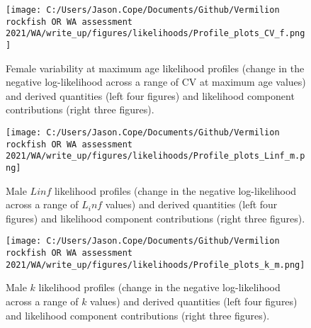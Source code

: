 \documentclass[11pt,
  english,
  a4paper,
]{article}
\begin{document}
\tagmcend\tagstructend


\begin{figure}
\centering
\texttt{[image: C:/Users/Jason.Cope/Documents/Github/Vermilion rockfish OR WA assessment 2021/WA/write\_up/figures/likelihoods/Profile\_plots\_CV\_f.png]}
\caption{Female variability at maximum age likelihood profiles (change in the negative log-likelihood across a range of CV at maximum age values) and derived quantities (left four figures) and likelihood component contributions (right three figures).\label{fig:CVold_f-profile-combo}}
\end{figure}

\tagmcend\tagstructend


\begin{figure}
\centering
\texttt{[image: C:/Users/Jason.Cope/Documents/Github/Vermilion rockfish OR WA assessment 2021/WA/write\_up/figures/likelihoods/Profile\_plots\_Linf\_m.png]}
\caption{Male {\(Linf\)\leavevmode\tagmcend\tagstructend} likelihood profiles (change in the negative log-likelihood across a range of {\(L_inf\)\leavevmode\tagmcend\tagstructend} values) and derived quantities (left four figures) and likelihood component contributions (right three figures).\label{fig:Linf_M-profile-combo}}
\end{figure}

\tagmcend\tagstructend


\begin{figure}
\centering
\texttt{[image: C:/Users/Jason.Cope/Documents/Github/Vermilion rockfish OR WA assessment 2021/WA/write\_up/figures/likelihoods/Profile\_plots\_k\_m.png]}
\caption{Male {\(k\)\leavevmode\tagmcend\tagstructend} likelihood profiles (change in the negative log-likelihood across a range of {\(k\)\leavevmode\tagmcend\tagstructend} values) and derived quantities (left four figures) and likelihood component contributions (right three figures).\label{fig:k_m-profile-combo}}
\end{figure}
\end{document}
